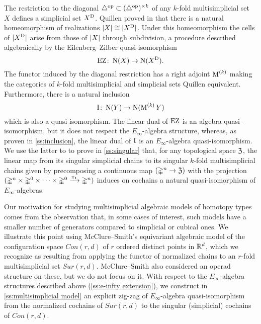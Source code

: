 The restriction to the diagonal $\triangle^{\mathrm{op}} \subset (\triangle^{\mathrm{op}})^{\times k}$ of any $k$-fold multisimplicial set $X$ defines a simplicial set $X^{\mathrm{D}}$.
Quillen proved in \cite{Quillen} that there is a natural homeomorphism of realizations $\lvert X\rvert \cong \lvert X^{\mathrm{D}}\rvert$.
Under this homeomorphism the cells of $\lvert X^{\mathrm{D}}\rvert$ arise from those of $\lvert X\rvert$ through subdivision, a procedure described algebraically by the Eilenberg--Zilber quasi-isomorphism
\[
\operatorname{EZ} \colon \operatorname{N}(X) \to \operatorname{N}(X^{\mathrm{D}}).
\]
The functor induced by the diagonal restriction has a right adjoint $\operatorname{M}^{(k)}$ making the categories of $k$-fold multisimplicial and simplicial sets Quillen equivalent.
Furthermore, there is a natural inclusion
\[
\operatorname{I} \colon \operatorname{N}(Y) \to \operatorname{N}(\operatorname{M}^{(k)} Y)
\]
which is also a quasi-isomorphism.
The linear dual of $\operatorname{EZ}$ is an algebra quasi-isomorphism, but it does not respect the $E_\infty$-algebra structure, whereas, as proven in \cref{ss:inclusion}, the linear dual of $\operatorname{I}$ is an $E_\infty$-algebra quasi-isomorphism.
We use the latter to to prove in \cref{ss:singular} that, for any topological space $\mathfrak{Z}$, the linear map from its singular simplicial chains to its singular $k$-fold multisimplicial chains given by precomposing a continuous map $(\mathbb{\Delta}^n \to \mathfrak{Z})$ with the projection $(\mathbb{\Delta}^n \times \mathbb{\Delta}^{0}\times\dots\times\mathbb{\Delta}^{0} \xrightarrow{\pi_1} \mathbb{\Delta}^n)$ induces on cochains a natural quasi-isomorphism of $E_\infty$-algebras.



Our motivation for studying multisimplicial algebraic models of homotopy types comes from the observation that, in some cases of interest, such models have a smaller number of generators compared to simplicial or cubical ones.
We illustrate this point using McClure--Smith's \cite{mcclure2003multivariable} equivariant algebraic model of the configuration space $Con(r,d)$ of $r$ ordered distinct points in $\mathbb{R}^d$, which we recognize as resulting from applying the functor of normalized chains to an $r$-fold multisimplicial set $Sur(r,d)$.
McClure--Smith also considered an operad structure on these, but we do not focus on it.
With respect to the $E_\infty$-algebra structures described above (\cref{ss:e-infty extension}), we construct in \cref{ss:multisimplicial model} an explicit zig-zag of $E_\infty$-algebra quasi-isomorphism from the normalized cochains of $Sur(r,d)$ to the singular (simplicial) cochains of $Con(r,d)$.

